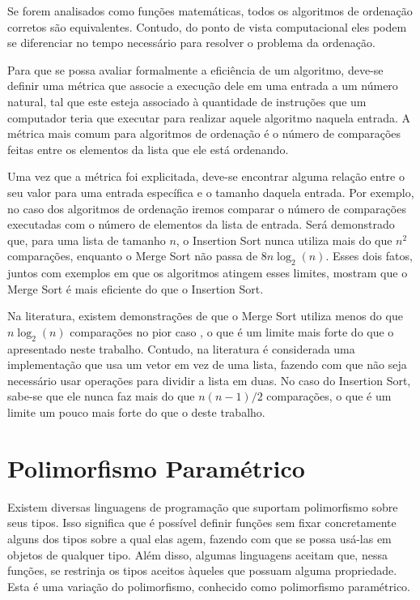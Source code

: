 \documentclass[12pt, oneside, a4paper,english,brazil]{abntex2}
\begin{document}
\qquad Se forem analisados como fun\c{c}\~oes matem\'aticas, todos os algoritmos de ordena\c{c}\~ao corretos
s\~ao equivalentes. Contudo, do ponto de vista computacional eles podem se diferenciar no tempo necess\'ario
para resolver o problema da ordena\c{c}\~ao.

\qquad Para que se possa avaliar formalmente a efici\^encia de um algoritmo, deve-se definir uma m\'etrica
que associe a execu\c{c}\~ao dele em uma entrada a um n\'umero natural, tal que este esteja associado \`a
quantidade de instru\c{c}\~oes que um computador teria que executar para realizar aquele algoritmo naquela
entrada. A m\'etrica mais comum para algoritmos de ordena\c{c}\~ao \'e o n\'umero de compara\c{c}\~oes feitas
entre os elementos da lista que ele est\'a ordenando.

\qquad Uma vez que a m\'etrica foi explicitada, deve-se encontrar alguma rela\c{c}\~ao entre o seu valor para
uma entrada espec\'ifica e o tamanho daquela entrada. Por exemplo, no caso dos algoritmos de ordena\c{c}\~ao
iremos comparar o n\'umero de compara\c{c}\~oes executadas com o n\'umero de elementos da lista de entrada.
Ser\'a demonstrado que, para uma lista de tamanho $n$, o Insertion Sort nunca utiliza mais do que $n^{2}$
compara\c{c}\~oes, enquanto o Merge Sort n\~ao passa de $8 n \log_{2} (n)$. Esses dois fatos,
juntos com exemplos em que os algoritmos atingem esses limites, mostram que o Merge Sort \'e mais eficiente
do que o Insertion Sort.

\qquad Na literatura, existem demonstra\c{c}\~oes de que o Merge Sort utiliza menos do que $n\log_{2}(n)$
compara\c{c}\~oes no pior caso \cite{1}, o que \'e um limite mais forte do que o apresentado neste trabalho.
Contudo, na literatura \'e considerada uma implementa\c{c}\~ao que usa um vetor em vez de uma lista,
fazendo com que n\~ao seja necess\'ario usar opera\c{c}\~oes para dividir a lista em duas. No caso do Insertion
Sort, sabe-se que ele nunca faz mais do
que $n(n - 1) / 2$ compara\c{c}\~oes, o que \'e um limite um pouco mais forte
do que o deste trabalho.

\section{Polimorfismo Param\'etrico}

\qquad Existem diversas linguagens de programa\c{c}\~ao que suportam polimorfismo sobre seus tipos. Isso
significa que \'e poss\'ivel definir fun\c{c}\~oes sem fixar concretamente alguns dos tipos sobre a qual elas
agem, fazendo com que se possa us\'a-las em objetos de qualquer tipo. Al\'em disso, algumas linguagens
aceitam que, nessa fun\c{c}\~oes, se restrinja os tipos aceitos \`aqueles que possuam alguma propriedade.
Esta \'e uma varia\c{c}\~ao do polimorfismo, conhecido como polimorfismo param\'etrico.
\end{document}

